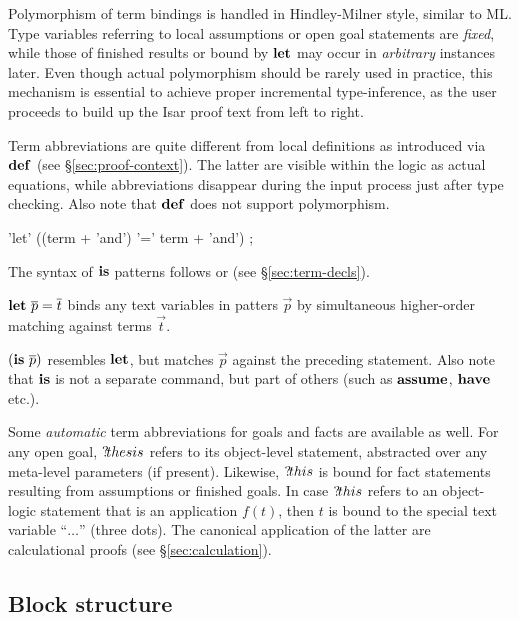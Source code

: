 Polymorphism of term bindings is handled in Hindley-Milner style, similar to
ML.  Type variables referring to local assumptions or open goal statements are
\emph{fixed}, while those of finished results or bound by ${\mathord{\mathbf{let}}}$ may occur
in \emph{arbitrary} instances later.  Even though actual polymorphism should
be rarely used in practice, this mechanism is essential to achieve proper
incremental type-inference, as the user proceeds to build up the Isar proof
text from left to right.

\medskip

Term abbreviations are quite different from local definitions as introduced
via ${\mathord{\mathbf{def}}}$ (see \S\ref{sec:proof-context}).  The latter are visible within
the logic as actual equations, while abbreviations disappear during the input
process just after type checking.  Also note that ${\mathord{\mathbf{def}}}$ does not support
polymorphism.

\begin{rail}
  'let' ((term + 'and') '=' term + 'and')
  ;  
\end{rail}

The syntax of ${\mathord{\mathbf{is}}}$ patterns follows  or
 (see \S\ref{sec:term-decls}).

\begin{descr}
\item [${\mathord{\mathbf{let}}}~\overline{p} = \overline{t}$] binds any text variables in patters $\vec p$
  by simultaneous higher-order matching against terms $\vec t$.
\item [$({\mathord{\mathbf{is}}}~\overline{p})$] resembles ${\mathord{\mathbf{let}}}$, but matches $\vec p$ against the
  preceding statement.  Also note that ${\mathord{\mathbf{is}}}$ is not a separate command,
  but part of others (such as ${\mathord{\mathbf{assume}}}$, ${\mathord{\mathbf{have}}}$ etc.).
\end{descr}

Some \emph{automatic} term abbreviations for goals
and facts are available as well.  For any open goal,
${?\!thesis}$ refers to its object-level statement,
abstracted over any meta-level parameters (if present).  Likewise,
${?\!this}$ is bound for fact statements resulting from
assumptions or finished goals.  In case ${?\!this}$ refers to an object-logic
statement that is an application $f(t)$, then $t$ is bound to the special text
variable ``$\dots$''\indexisarvar{\dots} (three dots).  The canonical
application of the latter are calculational proofs (see
\S\ref{sec:calculation}).


\subsection{Block structure}

